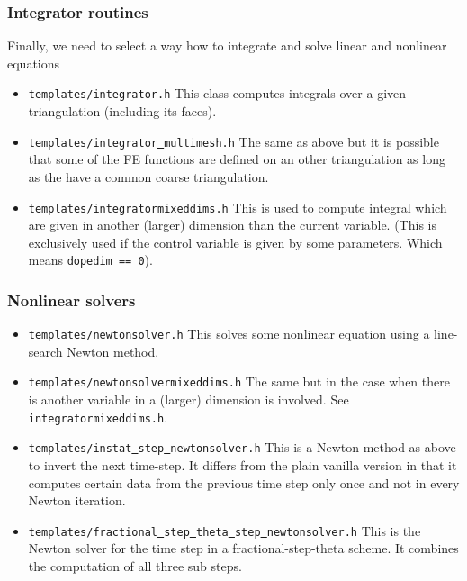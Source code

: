 \subsubsection{Integrator routines}
Finally, we need to select a way how to integrate and solve linear and nonlinear equations
\begin{itemize}
\item \texttt{templates/integrator.h} This class computes integrals over a given 
  triangulation (including its faces).
\item \texttt{templates/integrator\underline{ }multimesh.h} The same as above but it is 
  possible that some of the FE functions are defined on an other triangulation 
  as long as the have a common coarse triangulation.
\item \texttt{templates/integratormixeddims.h} This is used to compute integral which 
  are given in another (larger) dimension than the current variable. (This is exclusively
  used if the control variable is given by some parameters. Which means \texttt{dopedim == 0}). 
\end{itemize}

\subsubsection{Nonlinear solvers}
\begin{itemize}
\item \texttt{templates/newtonsolver.h} This solves some nonlinear equation using a 
  line-search Newton method.
\item \texttt{templates/newtonsolvermixeddims.h} The same but in the case when there is 
  another variable in a (larger) dimension is involved. See 
  \texttt{integratormixeddims.h}.
\item \texttt{templates/instat\underline{ }step\underline{ }newtonsolver.h} This is a 
  Newton method as above to invert the next time-step. It differs from the plain vanilla
  version in that it computes certain data from the previous time step only once 
  and not in every Newton iteration.
\item \texttt{templates/fractional\underline{ }step\underline{ }theta\underline{ }step\underline{ }newtonsolver.h} This is the Newton solver for the time step in a 
  fractional-step-theta scheme. It combines the computation of all three sub steps.
\end{itemize}

